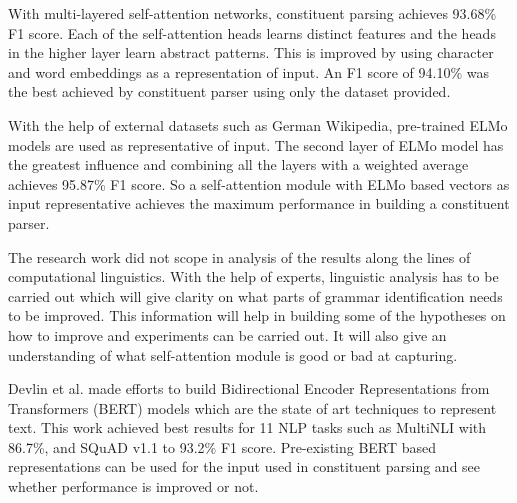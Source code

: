 \documentclass[a4paper, 11pt]{article}
\begin{document}
With multi-layered self-attention networks, constituent parsing achieves 93.68\% F1 score. Each of the self-attention heads learns distinct features and the heads in the higher layer learn abstract patterns. This is improved by using character and word embeddings as a representation of input. An F1 score of 94.10\% was the best achieved by constituent parser using only the dataset provided. 

With the help of external datasets such as German Wikipedia, pre-trained ELMo models are used as representative of input. The second layer of ELMo model has the greatest influence and combining all the layers with a weighted average achieves 95.87\% F1 score. So a self-attention module with ELMo based vectors as input representative achieves the maximum performance in building a constituent parser. 

The research work did not scope in analysis of the results along the lines of computational linguistics. With the help of experts, linguistic analysis has to be carried out which will give clarity on what parts of grammar identification needs to be improved. This information will help in building some of the hypotheses on how to improve and experiments can be carried out. It will also give an understanding of what self-attention module is good or bad at capturing.

Devlin et al. made efforts to build Bidirectional Encoder Representations from Transformers (BERT) \parencite{devlin2018bert} models which are the state of art techniques to represent text. This work achieved best results for 11 NLP tasks such as MultiNLI with 86.7\%, and SQuAD v1.1 to 93.2\% F1 score. Pre-existing BERT based representations can be used for the input used in constituent parsing and see whether performance is improved or not.



\newpage
\printbibliography
%
\end{document}
